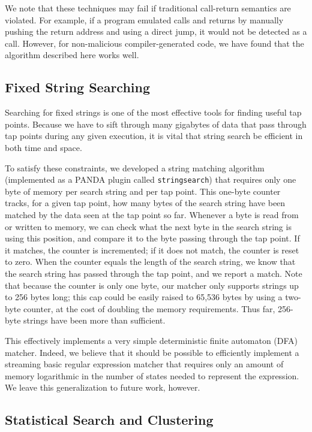 We note that these techniques may fail if traditional call-return
semantics are violated. For example, if a program emulated calls and
returns by manually pushing the return address and using a direct jump,
it would not be detected as a call. However, for non-malicious
compiler-generated code, we have found that the algorithm described here
works well.

\subsection{Fixed String Searching}
\label{sec:implementation:subsec:stringsearch}

Searching for fixed strings is one of the most effective tools for
finding useful tap points. Because we have to sift through many
gigabytes of data that pass through tap points during any given
execution, it is vital that string search be efficient in both time and
space.

To satisfy these constraints, we developed a string matching algorithm
(implemented as a PANDA plugin called \texttt{stringsearch}) that
requires only one byte of memory per search string and per tap point.
This one-byte counter tracks, for a given tap point, how many bytes of
the search string have been matched by the data seen at the tap point so
far. Whenever a byte is read from or written to memory, we can check
what the next byte in the search string is using this position, and
compare it to the byte passing through the tap point. If it matches, the
counter is incremented; if it does not match, the counter is reset to
zero. When the counter equals the length of the search string, we know
that the search string has passed through the tap point, and we report a
match. Note that because the counter is only one byte, our matcher only
supports strings up to 256 bytes long; this cap could be easily raised
to 65,536 bytes by using a two-byte counter, at the cost of doubling the
memory requirements. Thus far, 256-byte strings have been more than
sufficient.

This effectively implements a very simple deterministic finite automaton
(DFA) matcher. Indeed, we believe that it should be possible to
efficiently implement a streaming basic regular expression matcher that
requires only an amount of memory logarithmic in the number of states
needed to represent the expression. We leave this generalization to
future work, however.

\subsection{Statistical Search and Clustering}
\label{sec:implementation:subsec:bigram}


